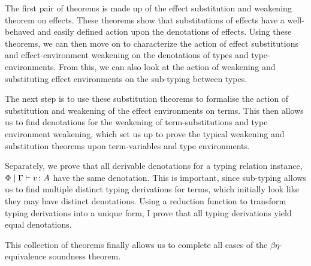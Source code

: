 \documentclass{Report}
\begin{document}
The first pair of theorems is made up of the effect substitution and weakening theorem on effects. These theorems show that substitutions of effects have a well-behaved and easily defined action upon the denotations of effects. Using these theorems, we can then move on to characterize the action of effect substitutions and effect-environment weakening on the denotations of types and type-environments. From this, we can also look at the action of weakening and substituting effect environments on the sub-typing between types.

The next step is to use these substitution theorems to formalise the action of substitution and weakening of the effect environments on terms. This then allows us to find denotations for the weakening of term-substitutions and type environment weakening, which set us up to prove the typical weakening and substitution theorems upon term-variables and type environments. 

Separately, we prove that all derivable denotations for a typing relation instance, $\Phi\mid\Gamma \vdash v \colon A$ have the same denotation. This is important, since sub-typing allows us to find multiple distinct typing derivations for terms, which initially look like they may have distinct denotations. Using a reduction function to transform typing derivations into a unique form, I prove that all typing derivations yield equal denotations.

This collection of theorems finally allows us to complete all cases of the $\beta\eta$-equivalence soundness theorem.
\end{document}
